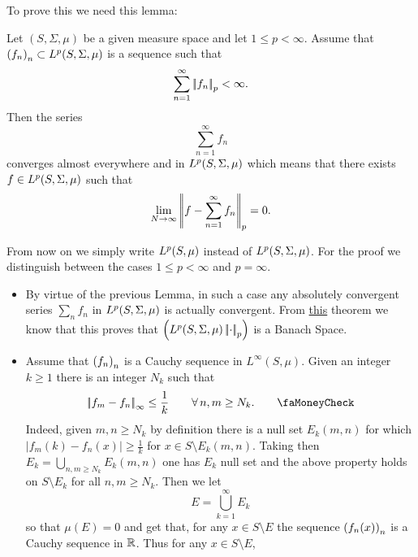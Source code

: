 \documentclass{article}
\begin{document}
\begin{fancyproof}
	To prove this we need this lemma:
	\begin{lemma}
		Let $(S,\Sigma,\mu)$ be a given measure space and let $1\leq p<\infty$. Assume that ${\left({f}_{n}\right)}_{n}\subset L^{p}(S,\Sigma,\mu)$ is a sequence such that
		\begin{equation*}
			\sum_{n=1}^{\infty}\left|\negthinspace\left|f_{n}\right|\negthinspace\right|_{p}<\infty.
		\end{equation*}
		Then the series 
		\begin{equation*}
			\sum_{n=1}^{\infty}f_{n}
		\end{equation*}
		converges almost everywhere and in $L^{p}(S,\Sigma,\mu)$ which means that there exists $f\in L^{p}(S,\Sigma,\mu)$ such that
		\begin{equation*}
			\lim_{N\to\infty}\left|\negthinspace\left|f-\sum_{n=1}^{\infty}f_{n}\right|\negthinspace\right|_{p}=0.
		\end{equation*}
	\end{lemma}
	From now on we simply write $L^{p}(S,\mu)$ instead of $L^{p}(S,\Sigma,\mu)$. For the proof we distinguish between the cases $1\leq p<\infty$ and $p=\infty$.
	\begin{itemize}
		\item By virtue of the previous Lemma, in such a case any absolutely convergent series $\sum_{n}f_{n}$ in $L^{p}(S,\Sigma,\mu)$ is actually convergent. From \hyperref[theo213]{this} theorem we know that this proves that $\left(L^{p}(S,\Sigma,\mu)\left|\negthinspace\left|\cdot\right|\negthinspace\right|_{p}\right)$ is a Banach Space.
		\item Assume that ${\left({f}_{n}\right)}_{n}$ is a Cauchy sequence in $L^{\infty}(S,\mu)$. Given an integer $k\geq 1$ there is an integer $N_{k}$ such that
		\begin{equation*}
			\norm{f_{m}-f_{n}}_{\infty}\leq\frac{1}{k}\qquad\every n,m\geq N_{k}.\tag*{\faMoneyCheck}\label{novabs}
		\end{equation*}
		Indeed, given $m,n\geq N_{k}$ by definition there is a null set $E_{k}(m,n)$ for which $\left|f_{m}(k)-f_{n}(x)\right|\geq\frac{1}{k}$ for $x\in S\setminus E_{k}(m,n)$. Taking then $E_{k}=\bigcup_{n,m\geq N_{k}}E_{k}(m,n)$ one has $E_{k}$ null set and the above property holds on $S\setminus E_{k}$ for all $n,m\geq N_{k}$. Then we let 
		\begin{equation*}
			E=\bigcup_{k=1}^{\infty}E_{k}
		\end{equation*}
		so that $\mu(E)=0$ and get that, for any $x\in S\setminus E$ the sequence ${\left(f_{n}(x)\right)}_{n}$ is a Cauchy sequence in $\mathbb{R}$. Thus for any $x\in S\setminus E$, 
		\begin{equation*}

\end{equation*}
\end{itemize}
\end{fancyproof}
\end{document}
